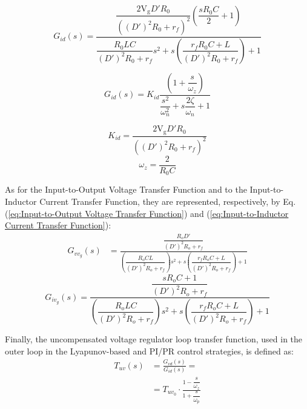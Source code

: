 \documentclass[DIV=calc, paper=a4, fontsize=11pt, twocolumn]{scrartcl}	 %
\begin{document}
{\small
\begin{equation}
G_{id}(s) = \frac{\dfrac{2\mathrm{V_g} D' R_0}{((D')^2 R_0 + r_f)^2} \left( \dfrac{s R_0 C}{2} + 1 \right)}{\dfrac{R_0 L C}{(D')^2 R_0 + r_f} s^2 + s \left( \dfrac{r_f R_0 C + L}{(D')^2 R_0 + r_f} \right) + 1}
\end{equation}

\begin{equation}
G_{id}(s) = K_{id} \frac{\left( 1 + \dfrac{s}{\omega_z} \right)}{\dfrac{s^2}{\omega_n^2} + s \dfrac{2\zeta}{\omega_n} + 1}
\end{equation}

\begin{equation}
K_{id} = \frac{2 \mathrm{V_g} D' R_0}{((D')^2 R_0 + r_f)^2}
\end{equation}
\begin{equation}
\omega_z = \frac{2}{R_0 C}
\end{equation}

As for the Input-to-Output Voltage Transfer Function and to the Input-to-Inductor Current Transfer Function, they are represented, respectively, by Eq. (\ref{eq:Input-to-Output Voltage Transfer Function}) and (\ref{eq:Input-to-Inductor Current Transfer Function}):
{ \small
\begin{equation}\label{eq:Input-to-Output Voltage Transfer Function}
\begin{aligned}
G_{vv_g}(s) &=\frac{ \dfrac{R_o D'}{(D')^2 R_o + r_f} }{ \left( \dfrac{R_o CL}{(D')^2 R_o + r_f} \right)s^2 + s\left( \dfrac{r_f R_o C + L}{(D')^2 R_o + r_f} \right) + 1 }
\end{aligned}
\end{equation}
}
{\small
\begin{equation}\label{eq:Input-to-Inductor Current Transfer Function}
G_{iv_g}(s) = \frac{\dfrac{sR_o C + 1}{(D')^2 R_o + r_f}}{\left( \dfrac{R_o LC}{(D')^2 R_o + r_f} \right) s^2 + s \left( \dfrac{r_f R_o C + L}{(D')^2 R_o + r_f} \right) + 1}
\end{equation}
}

Finally, the uncompensated voltage regulator loop transfer function, used in the outer loop in the Lyapunov-based and PI/PR control strategies, is defined as:
\begin{equation}
\begin{aligned}
T_{uv}(s)&=\frac{G_{vd}(s)}{G_{id}(s)}=\\
&= T_{uv_0} \cdot \frac{ 1 - \dfrac{s}{\omega_z} }{ 1 + \dfrac{s}{\omega_p} }
\end{aligned}
\end{equation}

}
\end{document}
